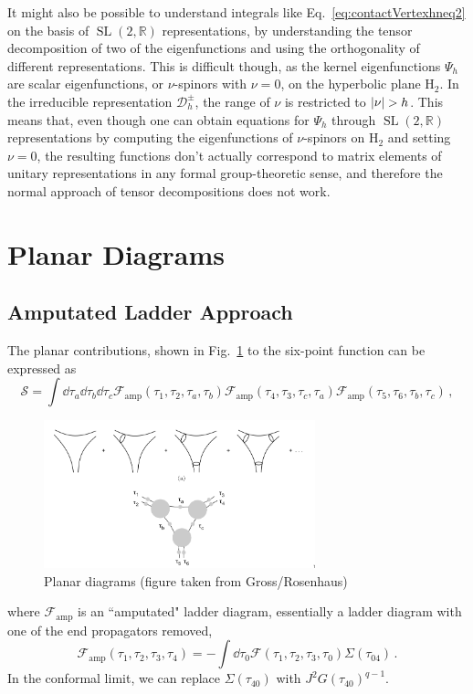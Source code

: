 \documentclass[aps,prx,preprint,onecolumn,citeautoscript,footinbib]{revtex4-1}
\newcommand{\SL}{\operatorname{SL}}
\begin{document}
It might also be possible to understand integrals like Eq.~\ref{eq:contactVertexhneq2} on the basis of $\SL(2, \mathbb{R})$ representations, by understanding the tensor decomposition of two of the eigenfunctions and using the orthogonality of different representations. This is difficult though, as the kernel eigenfunctions $\Psi_h$ are scalar eigenfunctions, or $\nu$-spinors with $\nu=0$, on the hyperbolic plane $\text{H}_2$. In the irreducible representation $\mathcal{D}^\pm_h$, the range of $\nu$ is restricted to $\abs{\nu} > h$. This means that, even though one can obtain equations for $\Psi_h$ through $\SL(2, \mathbb{R})$ representations by computing the eigenfunctions of $\nu$-spinors on $\text{H}_2$ and setting $\nu=0$, the resulting functions don't actually correspond to matrix elements of unitary representations in any formal group-theoretic sense, and therefore the normal approach of tensor decompositions does not work.
\section{Planar Diagrams}
\subsection{Amputated Ladder Approach}
The planar contributions, shown in Fig.~\ref{fig:planar} to the six-point function can be expressed as
\begin{equation}
    \mathcal{S} = \int \dd{\tau_a} \dd{\tau_b} \dd{\tau_c} \mathcal{F}_{\text{amp}}(\tau_1, \tau_2, \tau_a, \tau_b)
     \mathcal{F}_{\text{amp}}(\tau_4, \tau_3, \tau_c, \tau_a)
      \mathcal{F}_{\text{amp}}(\tau_5, \tau_6, \tau_b, \tau_c)\,,
      \label{eq:planarIntegral}
\end{equation}
\begin{figure}
    \centering
    \includegraphics[width=0.7\textwidth]{planar.png}
    \caption{Planar diagrams (figure taken from Gross/Rosenhaus)}
    \label{fig:planar}
\end{figure}
where $\mathcal{F}_{\text{amp}}$ is an ``amputated" ladder diagram, essentially a ladder diagram with one of the end propagators removed,
\begin{equation}
    \mathcal{F}_{\text{amp}}(\tau_1, \tau_2, \tau_3, \tau_4) = - \int \dd{\tau_0} \mathcal{F}(\tau_1, \tau_2, \tau_3, \tau_0) \Sigma(\tau_{04})\,.
\end{equation}
In the conformal limit, we can replace $\Sigma(\tau_{40})$ with $J^2 G(\tau_{40})^{q-1}$.
\end{document}
